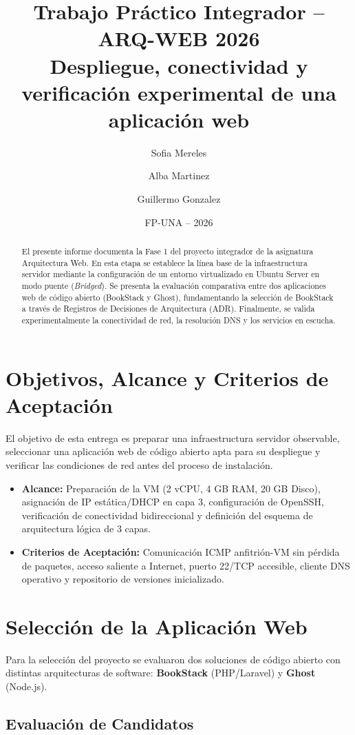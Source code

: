 \documentclass[12pt,a4paper]{article}
\title{\textbf{Trabajo Práctico Integrador -- ARQ-WEB 2026}\\Despliegue, conectividad y verificación experimental de una aplicación web}
\author{Sofia Mereles \and Alba Martinez \and Guillermo Gonzalez}
\date{FP-UNA -- 2026}
\begin{document}
\maketitle

\begin{abstract}
El presente informe documenta la Fase 1 del proyecto integrador de la asignatura Arquitectura Web. En esta etapa se establece la línea base de la infraestructura servidor mediante la configuración de un entorno virtualizado en Ubuntu Server en modo puente (\textit{Bridged}). Se presenta la evaluación comparativa entre dos aplicaciones web de código abierto (BookStack y Ghost), fundamentando la selección de BookStack a través de Registros de Decisiones de Arquitectura (ADR). Finalmente, se valida experimentalmente la conectividad de red, la resolución DNS y los servicios en escucha.
\end{abstract}

\section{Objetivos, Alcance y Criterios de Aceptación}
El objetivo de esta entrega es preparar una infraestructura servidor observable, seleccionar una aplicación web de código abierto apta para su despliegue y verificar las condiciones de red antes del proceso de instalación.

\begin{itemize}
    \item \textbf{Alcance:} Preparación de la VM (2 vCPU, 4 GB RAM, 20 GB Disco), asignación de IP estática/DHCP en capa 3, configuración de OpenSSH, verificación de conectividad bidireccional y definición del esquema de arquitectura lógica de 3 capas.
    \item \textbf{Criterios de Aceptación:} Comunicación ICMP anfitrión-VM sin pérdida de paquetes, acceso saliente a Internet, puerto 22/TCP accesible, cliente DNS operativo y repositorio de versiones inicializado.
\end{itemize}

\section{Selección de la Aplicación Web}

Para la selección del proyecto se evaluaron dos soluciones de código abierto con distintas arquitecturas de software: \textbf{BookStack} (PHP/Laravel) y \textbf{Ghost} (Node.js).

\subsection{Evaluación de Candidatos}
\end{document}
